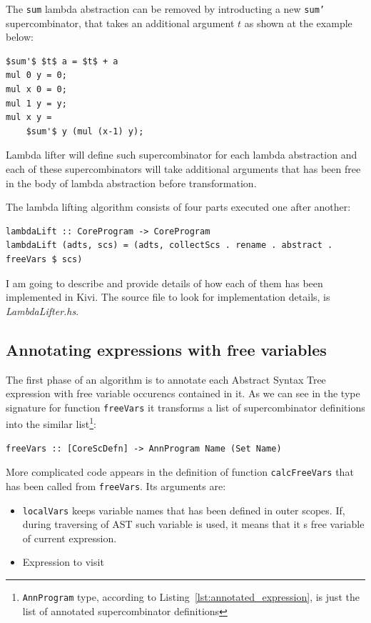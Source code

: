 \documentclass[12pt,a4paper]{report}
\begin{document}
The \texttt{sum} lambda abstraction can be removed by introducting a new
\texttt{sum'} supercombinator, that takes an additional argument $t$ as shown at
the example below:

\vspace*{0.2in}
\begin{lstlisting}[style=haskell,mathescape=true]
$sum'$ $t$ a = $t$ + a
mul 0 y = 0;
mul x 0 = 0;
mul 1 y = y;
mul x y =
    $sum'$ y (mul (x-1) y);
\end{lstlisting}

Lambda lifter will define such supercombinator for each lambda abstraction and
each of these supercombinators will take additional arguments that has been
free in the body of lambda abstraction before transformation.

The lambda lifting algorithm consists of four parts executed one after another:

\vspace*{0.2in}
\begin{lstlisting}[style=haskell]
lambdaLift :: CoreProgram -> CoreProgram
lambdaLift (adts, scs) = (adts, collectScs . rename . abstract . freeVars $ scs)
\end{lstlisting}

I am going to describe and provide details of how each of them has been
implemented in Kivi. The source file to look for implementation details, is
\textit{LambdaLifter.hs}.

\subsection{Annotating expressions with free variables}
The first phase of an algorithm is to annotate each Abstract Syntax Tree
expression with free variable occurencs contained in it. As we can see in the
type signature for function \texttt{freeVars} it transforms a list of
supercombinator definitions into the similar list\footnote{\texttt{AnnProgram}
type, according to Listing~\ref{lst:annotated_expression}, is just the list of
annotated supercombinator definitions}:

\vspace*{0.2in}
\begin{lstlisting}[style=haskell]
freeVars :: [CoreScDefn] -> AnnProgram Name (Set Name)
\end{lstlisting}

More complicated code appears in the definition of function
\texttt{calcFreeVars} that has been called from \texttt{freeVars}. Its
arguments are:
\begin{itemize}
  \item \texttt{localVars} keeps variable names that has been defined in outer
    scopes. If, during traversing of AST such variable is used, it means that
    it s free variable of current expression.
  \item Expression to visit
\end{itemize}
\end{document}
